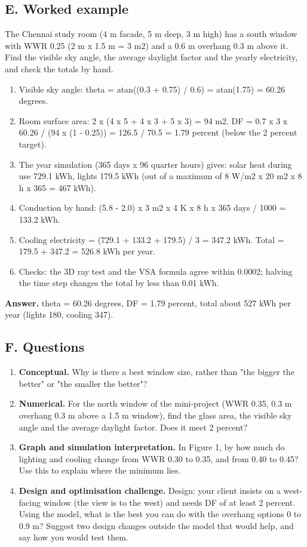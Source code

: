 \documentclass[11pt,a4paper]{article}
\begin{document}
\subsection*{E. Worked example}
The Chennai study room (4 m facade, 5 m deep, 3 m high) has a south window with WWR 0.25 (2 m x 1.5 m = 3 m2) and a 0.6 m overhang 0.3 m above it. Find the visible sky angle, the average daylight factor and the yearly electricity, and check the totals by hand.
\begin{enumerate}[nosep]
\item Visible sky angle: theta = atan((0.3 + 0.75) / 0.6) = atan(1.75) = 60.26 degrees.
\item Room surface area: 2 x (4 x 5 + 4 x 3 + 5 x 3) = 94 m2. DF = 0.7 x 3 x 60.26 / (94 x (1 - 0.25)) = 126.5 / 70.5 = 1.79 percent (below the 2 percent target).
\item The year simulation (365 days x 96 quarter hours) gives: solar heat during use 729.1 kWh, lights 179.5 kWh (out of a maximum of 8 W/m2 x 20 m2 x 8 h x 365 = 467 kWh).
\item Conduction by hand: (5.8 - 2.0) x 3 m2 x 4 K x 8 h x 365 days / 1000 = 133.2 kWh.
\item Cooling electricity = (729.1 + 133.2 + 179.5) / 3 = 347.2 kWh. Total = 179.5 + 347.2 = 526.8 kWh per year.
\item Checks: the 3D ray test and the VSA formula agree within 0.0002; halving the time step changes the total by less than 0.01 kWh.
\end{enumerate}
\textbf{Answer.} theta = 60.26 degrees, DF = 1.79 percent, total about 527 kWh per year (lights 180, cooling 347).

\subsection*{F. Questions}
\begin{enumerate}[nosep]
\item \textbf{Conceptual.} Why is there a best window size, rather than "the bigger the better" or "the smaller the better"?
\item \textbf{Numerical.} For the north window of the mini-project (WWR 0.35, 0.3 m overhang 0.3 m above a 1.5 m window), find the glass area, the visible sky angle and the average daylight factor. Does it meet 2 percent?
\item \textbf{Graph and simulation interpretation.} In Figure 1, by how much do lighting and cooling change from WWR 0.30 to 0.35, and from 0.40 to 0.45? Use this to explain where the minimum lies.
\item \textbf{Design and optimisation challenge.} Design: your client insists on a west-facing window (the view is to the west) and needs DF of at least 2 percent. Using the model, what is the best you can do with the overhang options 0 to 0.9 m? Suggest two design changes outside the model that would help, and say how you would test them.
\end{enumerate}
\end{document}
